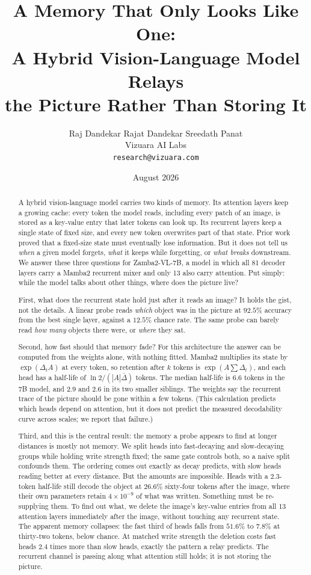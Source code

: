 \documentclass{article}
\title{A Memory That Only Looks Like One:\\
A Hybrid Vision-Language Model Relays\\
the Picture Rather Than Storing It}
\author{Raj Dandekar \quad Rajat Dandekar \quad Sreedath Panat\\[3pt]
Vizuara AI Labs\\
\texttt{research@vizuara.com}}
\date{August 2026}
\begin{document}
\maketitle

\begin{abstract}
\noindent
A hybrid vision-language model carries two kinds of memory. Its attention
layers keep a growing cache: every token the model reads, including every
patch of an image, is stored as a key-value entry that later tokens can look
up. Its recurrent layers keep a single state of fixed size, and every new
token overwrites part of that state. Prior work proved that a fixed-size state
must eventually lose information. But it does not tell us \emph{when} a given
model forgets, \emph{what} it keeps while forgetting, or \emph{what breaks}
downstream. We answer these three questions for Zamba2-VL-7B, a model in which
all 81 decoder layers carry a Mamba2 recurrent mixer and only 13 also carry
attention. Put simply: while the model talks about other things, where does
the picture live?

First, what does the recurrent state hold just after it reads an image? It
holds the gist, not the details. A linear probe reads \emph{which} object was
in the picture at $92.5\%$ accuracy from the best single layer, against a
$12.5\%$ chance rate. The same probe can barely read \emph{how many} objects
there were, or \emph{where} they sat.

Second, how fast should that memory fade? For this architecture the answer can
be computed from the weights alone, with nothing fitted. Mamba2 multiplies its
state by $\exp(\Delta_t A)$ at every token, so retention after $k$ tokens is
$\exp(A\sum\Delta_t)$, and each head has a half-life of
$\ln 2/(|A|\bar{\Delta})$ tokens. The median half-life is $6.6$ tokens in the
7B model, and $2.9$ and $2.6$ in its two smaller siblings. The weights say the
recurrent trace of the picture should be gone within a few tokens. (This
calculation predicts which heads depend on attention, but it does not predict
the measured decodability curve across scales; we report that failure.)

Third, and this is the central result: the memory a probe appears to find at
longer distances is mostly not memory. We split heads into fast-decaying and
slow-decaying groups while holding write strength fixed; the same gate
controls both, so a naive split confounds them. The ordering comes out exactly
as decay predicts, with slow heads reading better at every distance. But the
amounts are impossible. Heads with a $2.3$-token half-life still decode the
object at $26.6\%$ sixty-four tokens after the image, where their own
parameters retain $4\times10^{-9}$ of what was written. Something must be
re-supplying them. To find out what, we delete the image's key-value entries
from all 13 attention layers immediately after the image, without touching any
recurrent state. The apparent memory collapses: the fast third of heads falls
from $51.6\%$ to $7.8\%$ at thirty-two tokens, below chance. At matched write
strength the deletion costs fast heads $2.4$ times more than slow heads,
exactly the pattern a relay predicts. The recurrent channel is passing along
what attention still holds; it is not storing the picture.


\end{abstract}
\end{document}

